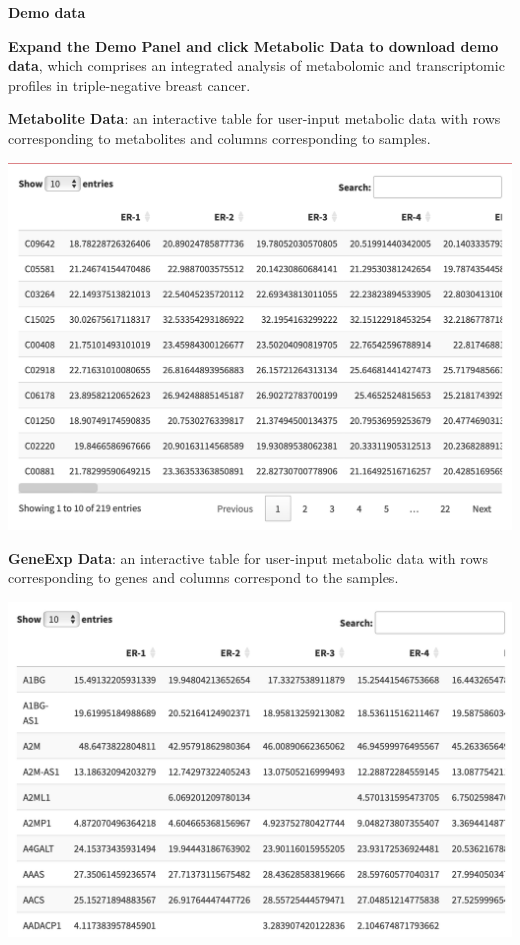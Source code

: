 \documentclass[
]{book}
\begin{document}
\textbf{Demo data}

\textbf{Expand the Demo Panel and click Metabolic Data to download demo data}, which comprises an integrated analysis of metabolomic and transcriptomic profiles in triple-negative breast cancer.

\textbf{Metabolite Data}: an interactive table for user-input metabolic data with rows corresponding to metabolites and columns corresponding to samples.

\includegraphics[width=22.64in]{figure/Metabolite}

\textbf{GeneExp Data}: an interactive table for user-input metabolic data with rows corresponding to genes and columns correspond to the samples.

\includegraphics[width=22.42in]{figure/GeneExp}
\end{document}

